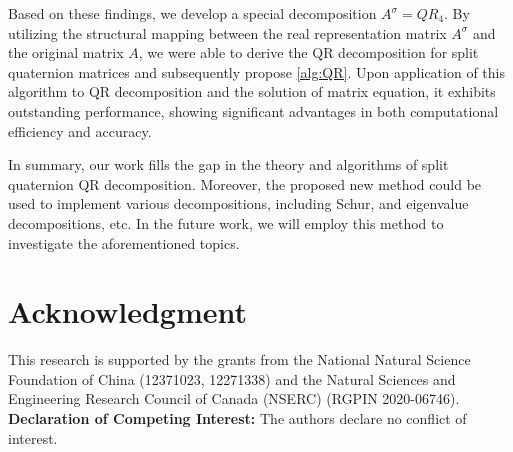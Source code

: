 \documentclass[12pt]{article}
\numberwithin{equation}{section}
\begin{document}
Based on these findings, we develop a special decomposition $A^\sigma = QR_4$. By utilizing the structural mapping between the real representation matrix $A^\sigma$ and the original matrix $A$, we were able to derive the QR decomposition for split quaternion matrices and subsequently propose \cref{alg:QR}. Upon application of this algorithm to QR decomposition and the solution of matrix equation, it exhibits outstanding performance, showing significant advantages in both computational efficiency and accuracy.

In summary, our work fills the gap in the theory and algorithms of split quaternion QR decomposition. Moreover,  the proposed new method could be used to implement various decompositions, including Schur, and eigenvalue decompositions, etc. In the future work, we will employ this method to investigate the aforementioned topics.

\section*{Acknowledgment} This research is supported by the grants from the National Natural Science Foundation of China (12371023, 12271338) and the Natural Sciences and Engineering Research Council of Canada (NSERC) (RGPIN 2020-06746). 
\iffalse
{\bf Declaration of Competing Interest:} The authors declare no conflict of interest.
\\
\end{document}

